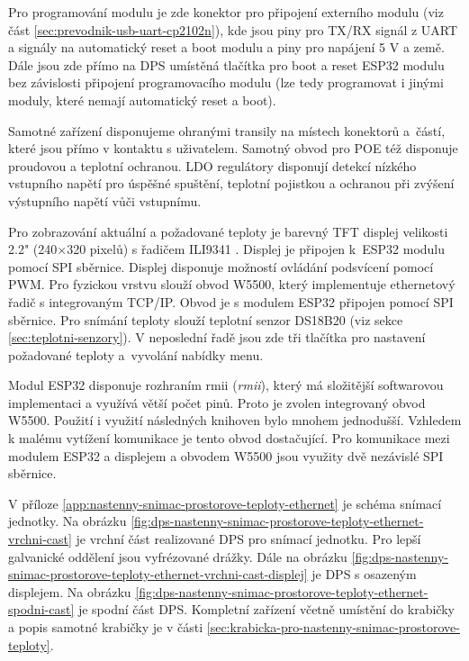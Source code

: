 Pro programování modulu je zde konektor pro připojení externího modulu (viz část \ref{sec:prevodnik-usb-uart-cp2102n}), kde jsou piny pro TX/RX signál z UART a signály na automatický reset a boot modulu a piny pro napájení 5 V a země. Dále jsou zde přímo na DPS umístěná tlačítka pro boot a reset ESP32 modulu bez závislosti připojení programovacího modulu (lze tedy programovat i jinými moduly, které nemají automatický reset a boot). 

Samotné zařízení disponujeme ohranými transily na místech konektorů a~částí, které jsou přímo v kontaktu s uživatelem. Samotný obvod pro POE též disponuje proudovou a teplotní ochranou. LDO regulátory disponují detekcí nízkého vstupního napětí pro úspěšné spuštění, teplotní pojistkou a ochranou při zvýšení výstupního napětí vůči vstupnímu. 

Pro zobrazování aktuální a požadované teploty je barevný TFT displej velikosti 2.2" (240×320 pixelů) s řadičem ILI9341 \cite{lcd-ili9341}. Displej je připojen k~ESP32 modulu pomocí SPI sběrnice. Displej disponuje možností ovládání podsvícení pomocí PWM. Pro fyzickou vrstvu slouží obvod W5500, který implementuje ethernetový řadič s integrovaným TCP/IP. Obvod je s modulem ESP32 připojen pomocí SPI sběrnice. Pro snímání teploty slouží teplotní senzor DS18B20 (viz sekce \ref{sec:teplotni-senzory}). V neposlední řadě jsou zde tři tlačítka pro nastavení požadované teploty a~vyvolání nabídky menu.

Modul ESP32 disponuje rozhraním \acrshort{rmii} (\textit{\acrlong{rmii}}), který má složitější softwarovou implementaci a využívá větší počet pinů. Proto je zvolen integrovaný obvod W5500. Použití i využití následných knihoven bylo mnohem jednodušší. Vzhledem k malému vytížení komunikace je tento obvod dostačující. Pro komunikace mezi modulem ESP32 a displejem a obvodem W5500 jsou využity dvě nezávislé SPI sběrnice. 

V příloze \ref{app:nastenny-snimac-prostorove-teploty-ethernet} je schéma snímací jednotky. Na obrázku \ref{fig:dps-nastenny-snimac-prostorove-teploty-ethernet-vrchni-cast} je vrchní část realizované DPS pro snímací jednotku. Pro lepší galvanické oddělení jsou vyfrézované drážky. Dále na obrázku \ref{fig:dps-nastenny-snimac-prostorove-teploty-ethernet-vrchni-cast-displej} je DPS s osazeným displejem. Na obrázku \ref{fig:dps-nastenny-snimac-prostorove-teploty-ethernet-spodni-cast} je spodní část DPS. Kompletní zařízení včetně umístění do krabičky a popis samotné krabičky je v části \ref{sec:krabicka-pro-nastenny-snimac-prostorove-teploty}.



